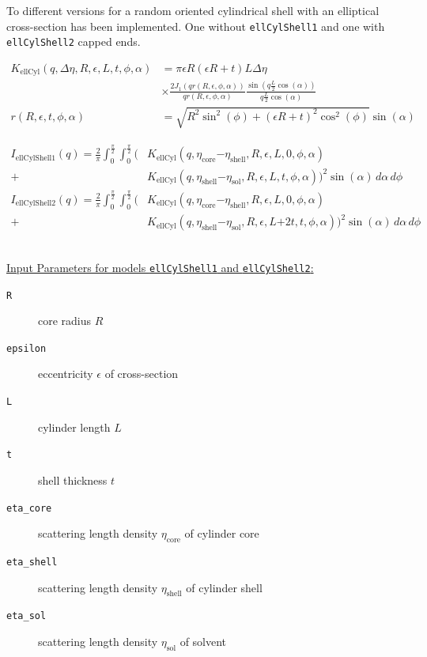 To different versions for a random oriented cylindrical shell with
an elliptical cross-section has been implemented. One without
\texttt{ellCylShell1} and one with \texttt{ellCylShell2} capped
ends.

\begin{align}
K_\text{ellCyl}(q,\Delta\eta,R,\epsilon,L,t,\phi,\alpha) &= \pi \epsilon R(\epsilon R+t) L
\Delta \eta \\
    & \times \frac{2J_1\left(q r(R,\epsilon,\phi,\alpha) \right)}{q r(R,\epsilon,\phi,\alpha)}
    \frac{\sin(q \frac{L}{2}\cos(\alpha))}{q\frac{L}{2}\cos(\alpha)} \nonumber \\
r(R,\epsilon,t,\phi,\alpha) &= \sqrt{R^2\sin^2(\phi)+(\epsilon R+t)^2\cos^2(\phi)} \sin(\alpha)
\end{align}

\begin{align}
I_\text{ellCylShell1}(q) = \frac{2}{\pi}\int_0^{\frac{\pi}{2}} \!\! \int_0^{\frac{\pi}{2}} \biggl(
  &
  K_\text{ellCyl}\left(q,\eta_\text{core}\mathord-\eta_\text{shell},R,\epsilon,L,0,\phi,\alpha\right) \\
+&  K_\text{ellCyl}\left(q,\eta_\text{shell}\mathord-\eta_\text{sol},R,\epsilon,L,t,\phi,\alpha\right)
\biggr)^2 \sin(\alpha) \,d\alpha\, d\phi \nonumber \\
I_\text{ellCylShell2}(q) = \frac{2}{\pi}\int_0^{\frac{\pi}{2}} \!\!  \int_0^{\frac{\pi}{2}}  \biggl(
 &  K_\text{ellCyl}\left(q,\eta_\text{core}\mathord-\eta_\text{shell},R,\epsilon,L,0,\phi,\alpha\right) \\
+&  K_\text{ellCyl}\left(q,\eta_\text{shell}\mathord-\eta_\text{sol},R,\epsilon,L\mathord+2t,t,\phi,\alpha\right) \biggr)^2 \sin(\alpha) \,d\alpha \,d\phi  \nonumber
\end{align}


\vspace{5mm}

\hspace{1pt}\\
\underline{Input Parameters for models \texttt{ellCylShell1} and \texttt{ellCylShell2}:}\\
\begin{description}
\item[\texttt{R}] core radius $R$
\item[\texttt{epsilon}] eccentricity $\epsilon$ of cross-section
\item[\texttt{L}] cylinder length $L$
\item[\texttt{t}] shell thickness $t$
\item[\texttt{eta\_core}] scattering length density $\eta_\text{core}$ of cylinder core
\item[\texttt{eta\_shell}] scattering length density $\eta_\text{shell}$ of cylinder shell
\item[\texttt{eta\_sol}] scattering length density $\eta_\text{sol}$ of solvent
\end{description}

